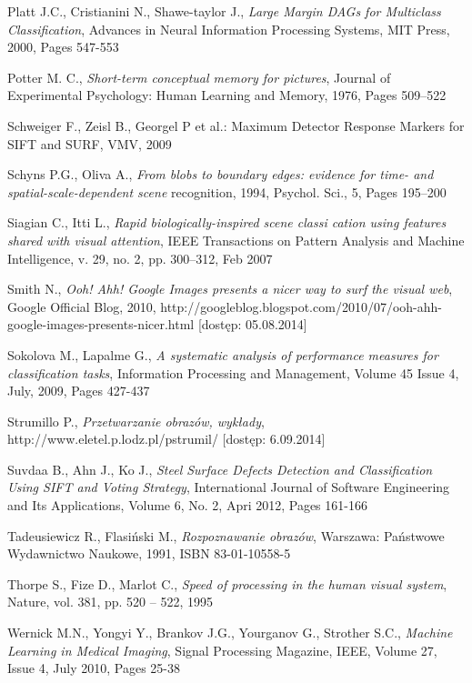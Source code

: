 \begin{thebibliography}{100}
 Platt J.C., Cristianini N., Shawe-taylor J., \emph{Large Margin DAGs for Multiclass Classification}, Advances in Neural Information Processing Systems, MIT Press, 2000, Pages 547-553

 Potter M. C., \emph{Short-term conceptual memory for pictures}, Journal of Experimental Psychology: Human Learning and Memory, 1976, Pages 509–522

 Schweiger F., Zeisl B., Georgel P et al.: Maximum Detector Response Markers for SIFT and SURF, VMV, 
2009

 Schyns P.G., Oliva A., \emph{From blobs to boundary edges: evidence for time- and spatial-scale-dependent scene} recognition, 1994, Psychol. Sci., 5, Pages 195–200

 Siagian C., Itti L., \emph{Rapid biologically-inspired scene classi cation using features shared with visual attention}, IEEE Transactions on Pattern Analysis and Machine Intelligence, v. 29, no. 2, pp. 300–312, Feb 2007

 Smith N., \emph{Ooh! Ahh! Google Images presents a nicer way to surf the visual web}, Google Official Blog, 2010, http://googleblog.blogspot.com/2010/07/ooh-ahh-google-images-presents-nicer.html [dostęp: 05.08.2014]

 Sokolova M., Lapalme G., \emph{A systematic analysis of performance measures for classification tasks}, Information Processing and Management, Volume 45 Issue 4, July, 2009, Pages 427-437 

 Strumillo P., \emph{Przetwarzanie obrazów, wykłady}, http://www.eletel.p.lodz.pl/pstrumil/ [dostęp: 6.09.2014]

 Suvdaa B., Ahn J., Ko J., \emph{Steel Surface Defects Detection and Classification Using SIFT and Voting Strategy}, International Journal of Software Engineering and Its Applications, Volume 6, No. 2, Apri 2012, Pages 161-166

 Tadeusiewicz R., Flasiński M., \emph{Rozpoznawanie obrazów}, Warszawa: Państwowe Wydawnictwo Naukowe, 1991, ISBN 83-01-10558-5

 Thorpe S., Fize D., Marlot C., \emph{Speed of processing in the human visual system}, Nature, vol. 381, pp. 520 – 522, 1995

 Wernick M.N., Yongyi Y., Brankov J.G., Yourganov G., Strother S.C., \emph{Machine Learning in Medical Imaging}, Signal Processing Magazine, IEEE, Volume 27,  Issue 4, July 2010, Pages 25-38


\end{thebibliography}
